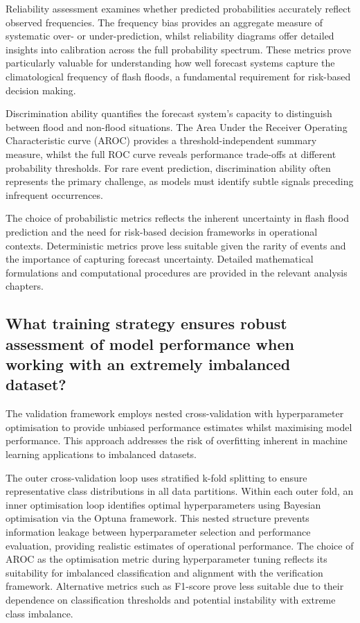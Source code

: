 Reliability assessment examines whether predicted probabilities accurately reflect observed frequencies. The frequency bias provides an aggregate measure of systematic over- or under-prediction, whilst reliability diagrams offer detailed insights into calibration across the full probability spectrum. These metrics prove particularly valuable for understanding how well forecast systems capture the climatological frequency of flash floods, a fundamental requirement for risk-based decision making.

Discrimination ability quantifies the forecast system's capacity to distinguish between flood and non-flood situations. The Area Under the Receiver Operating Characteristic curve (AROC) provides a threshold-independent summary measure, whilst the full ROC curve reveals performance trade-offs at different probability thresholds. For rare event prediction, discrimination ability often represents the primary challenge, as models must identify subtle signals preceding infrequent occurrences.

The choice of probabilistic metrics reflects the inherent uncertainty in flash flood prediction and the need for risk-based decision frameworks in operational contexts. Deterministic metrics prove less suitable given the rarity of events and the importance of capturing forecast uncertainty. Detailed mathematical formulations and computational procedures are provided in the relevant analysis chapters.


\subsection{What training strategy ensures robust assessment of model performance when working with an extremely imbalanced dataset?}

The validation framework employs nested cross-validation with hyperparameter optimisation to provide unbiased performance estimates whilst maximising model performance. This approach addresses the risk of overfitting inherent in machine learning applications to imbalanced datasets.

The outer cross-validation loop uses stratified k-fold splitting to ensure representative class distributions in all data partitions. Within each outer fold, an inner optimisation loop identifies optimal hyperparameters using Bayesian optimisation via the Optuna framework. This nested structure prevents information leakage between hyperparameter selection and performance evaluation, providing realistic estimates of operational performance.
The choice of AROC as the optimisation metric during hyperparameter tuning reflects its suitability for imbalanced classification and alignment with the verification framework. Alternative metrics such as F1-score prove less suitable due to their dependence on classification thresholds and potential instability with extreme class imbalance.

